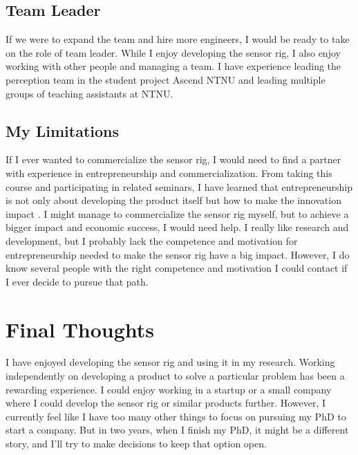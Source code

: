 \documentclass{iopconfser}
\begin{document}
\subsection*{Team Leader}
If we were to expand the team and hire more engineers, I would be ready to take on the role of team leader.
While I enjoy developing the sensor rig, I also enjoy working with other people and managing a team.
I have experience leading the perception team in the student project Ascend NTNU and leading multiple groups of teaching assistants at NTNU.

\subsection*{My Limitations}
If I ever wanted to commercialize the sensor rig, I would need to find a partner with experience in entrepreneurship and commercialization.
From taking this course and participating in related seminars, I have learned that entrepreneurship is not only about developing the product itself but how to make the innovation impact \cite{widdingWhatDoesIt2024}.
I might manage to commercialize the sensor rig myself, but to achieve a bigger impact and economic success, I would need help.
I really like research and development, but I probably lack the competence and motivation for entrepreneurship needed to make the sensor rig have a big impact.
However, I do know several people with the right competence and motivation I could contact if I ever decide to pursue that path.

\pagebreak
\section*{Final Thoughts}
I have enjoyed developing the sensor rig and using it in my research.
Working independently on developing a product to solve a particular problem has been a rewarding experience.
I could enjoy working in a startup or a small company where I could develop the sensor rig or similar products further.
However, I currently feel like I have too many other things to focus on pursuing my PhD to start a company.
But in two years, when I finish my PhD, it might be a different story, and I'll try to make decisions to keep that option open.


\printbibliography
\end{document}

